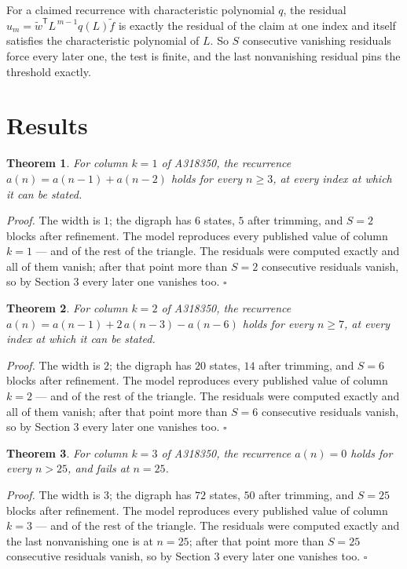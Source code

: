 \documentclass[11pt]{article}
\newtheorem{theorem}{Theorem}
\theoremstyle{definition}
\begin{document}
For a claimed recurrence with characteristic polynomial $q$, the residual $u_m = \tilde w^{\mathsf T}L^{\,m-1}q(L)\tilde f$ is exactly the residual of the claim at one index and itself satisfies the characteristic polynomial of $L$. So $S$ consecutive vanishing residuals force every later one, the test is finite, and the last nonvanishing residual pins the threshold exactly.

\section{Results}

\begin{theorem} For column $k = 1$ of A318350, the recurrence $a(n) = a(n-1) + a(n-2)$ holds for every $n \ge 3$, at every index at which it can be stated.\end{theorem}

{\itshape Proof.} The width is $1$; the digraph has $6$ states, $5$ after trimming, and $S = 2$ blocks after refinement. The model reproduces every published value of column $k = 1$ --- and of the rest of the triangle. The residuals were computed exactly and all of them vanish; after that point more than $S = 2$ consecutive residuals vanish, so by Section 3 every later one vanishes too. $\square$

\begin{theorem} For column $k = 2$ of A318350, the recurrence $a(n) = a(n-1) + 2\,a(n-3) - a(n-6)$ holds for every $n \ge 7$, at every index at which it can be stated.\end{theorem}

{\itshape Proof.} The width is $2$; the digraph has $20$ states, $14$ after trimming, and $S = 6$ blocks after refinement. The model reproduces every published value of column $k = 2$ --- and of the rest of the triangle. The residuals were computed exactly and all of them vanish; after that point more than $S = 6$ consecutive residuals vanish, so by Section 3 every later one vanishes too. $\square$

\begin{theorem} For column $k = 3$ of A318350, the recurrence $a(n) = 0$ holds for every $n > 25$, and fails at $n = 25$.\end{theorem}

{\itshape Proof.} The width is $3$; the digraph has $72$ states, $50$ after trimming, and $S = 25$ blocks after refinement. The model reproduces every published value of column $k = 3$ --- and of the rest of the triangle. The residuals were computed exactly and the last nonvanishing one is at $n = 25$; after that point more than $S = 25$ consecutive residuals vanish, so by Section 3 every later one vanishes too. $\square$
\end{document}
